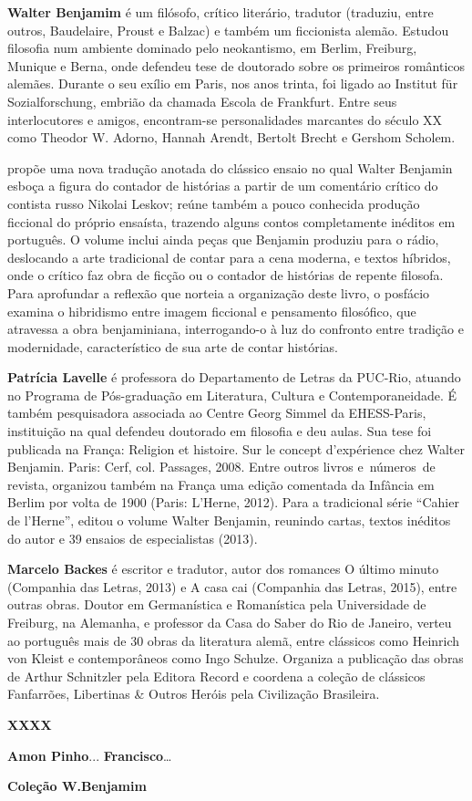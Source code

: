 
\textbf{Walter Benjamim} é um filósofo, crítico literário, tradutor (traduziu, entre outros, Baudelaire, Proust e Balzac) e também um ficcionista alemão. Estudou filosofia num ambiente dominado pelo neokantismo, em Berlim, Freiburg, Munique e Berna, onde defendeu tese de doutorado sobre os primeiros românticos alemães. Durante o seu exílio em Paris, nos anos trinta, foi ligado ao Institut für Sozialforschung, embrião da chamada Escola de Frankfurt. Entre seus interlocutores e amigos, encontram-se personalidades marcantes do século XX como Theodor W. Adorno, Hannah Arendt, Bertolt Brecht e Gershom Scholem.

\textbf{\titulo} propõe uma nova tradução anotada do clássico ensaio no qual Walter Benjamin esboça a figura do contador de histórias a partir de um comentário crítico do contista russo Nikolai Leskov; reúne também a pouco conhecida produção ficcional do próprio ensaísta, trazendo alguns contos completamente inéditos em português. O volume inclui ainda peças que Benjamin produziu para o rádio, deslocando a arte tradicional de contar para a cena moderna, e textos híbridos, onde o crítico faz obra de ficção ou o contador de histórias de repente filosofa. Para aprofundar a reflexão que norteia a organização deste livro, o posfácio examina o hibridismo entre imagem ficcional e pensamento filosófico, que atravessa a obra benjaminiana, interrogando-o à luz do confronto entre tradição e modernidade, característico de sua arte de contar histórias.

\textbf{Patrícia Lavelle} é professora do Departamento de Letras da PUC-Rio, atuando no Programa de Pós-graduação em Literatura, Cultura e Contemporaneidade. É também pesquisadora associada ao Centre Georg Simmel da EHESS-Paris,  instituição na qual defendeu doutorado em filosofia e deu aulas. Sua tese foi publicada na França: Religion et histoire. Sur le concept d’expérience chez Walter Benjamin. Paris: Cerf, col. Passages, 2008. Entre outros livros e números de revista, organizou também na França uma edição comentada da Infância em Berlim por volta de 1900 (Paris: L’Herne, 2012). Para a tradicional série “Cahier de l’Herne”, editou o volume Walter Benjamin, reunindo cartas, textos inéditos do autor e 39 ensaios de especialistas (2013). 

\textbf{Marcelo Backes} é escritor e tradutor, autor dos romances O último minuto (Companhia das Letras, 2013) e A casa cai (Companhia das Letras, 2015), entre outras obras. Doutor em Germanística e Romanística pela Universidade de Freiburg, na Alemanha, e professor da Casa do Saber do Rio de Janeiro, verteu ao português mais de 30 obras da literatura alemã, entre clássicos como Heinrich von Kleist e contemporâneos como Ingo Schulze. Organiza a publicação das obras de Arthur Schnitzler pela Editora Record e coordena a coleção de clássicos Fanfarrões, Libertinas \& Outros Heróis pela Civilização Brasileira.

\textbf{XXXX} \lipsum[4]

\textbf{Amon Pinho}...
\textbf{Francisco}…

\textbf{Coleção W.Benjamim} \lipsum[6]


